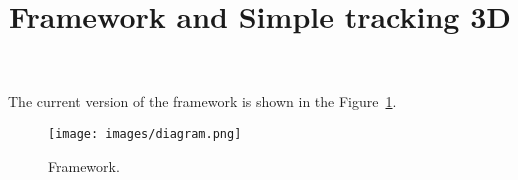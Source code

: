 \documentclass{article}
\title{Framework and Simple tracking 3D}
\begin{document}
\maketitle	

The current version of the framework is shown in the Figure~\ref{fig:diagram}.

\begin{figure}[!hbt]
	\centering
    \centerline{\texttt{[image: images/diagram.png]}}
    \caption{Framework.}
    \label{fig:diagram}
\end{figure}







%
\end{document}
